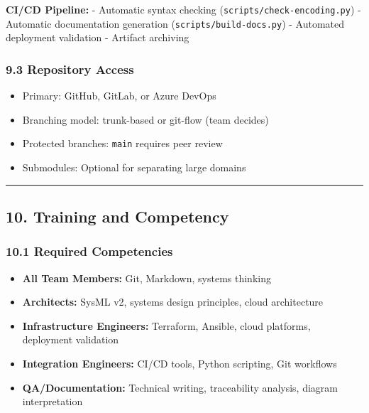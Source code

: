 \documentclass[12pt]{article}
\providecommand{\tightlist}{%
  \setlength{\itemsep}{0pt}\setlength{\parskip}{0pt}}
\begin{document}
\textbf{CI/CD Pipeline:} - Automatic syntax checking
(\texttt{scripts/check-encoding.py}) - Automatic documentation
generation (\texttt{scripts/build-docs.py}) - Automated deployment
validation - Artifact archiving

\subsubsection{9.3 Repository Access}\label{repository-access}

\begin{itemize}
\tightlist
\item
  Primary: GitHub, GitLab, or Azure DevOps
\item
  Branching model: trunk-based or git-flow (team decides)
\item
  Protected branches: \texttt{main} requires peer review
\item
  Submodules: Optional for separating large domains
\end{itemize}

\begin{center}\rule{0.5\linewidth}{0.5pt}\end{center}

\subsection{10. Training and Competency}\label{training-and-competency}

\subsubsection{10.1 Required Competencies}\label{required-competencies}

\begin{itemize}
\tightlist
\item
  \textbf{All Team Members:} Git, Markdown, systems thinking
\item
  \textbf{Architects:} SysML v2, systems design principles, cloud
  architecture
\item
  \textbf{Infrastructure Engineers:} Terraform, Ansible, cloud
  platforms, deployment validation
\item
  \textbf{Integration Engineers:} CI/CD tools, Python scripting, Git
  workflows
\item
  \textbf{QA/Documentation:} Technical writing, traceability analysis,
  diagram interpretation
\end{itemize}
\end{document}
